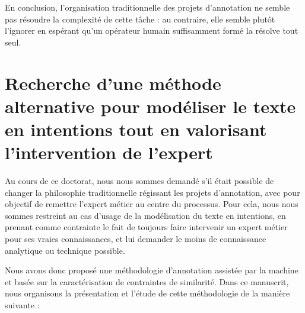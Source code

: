 		En conclusion, l'organisation traditionnelle des projets d'annotation ne semble pas résoudre la complexité de cette tâche : au contraire, elle semble plutôt l'ignorer en espérant qu'un opérateur humain suffisamment formé la résolve tout seul.
		
		
	\section*{Recherche d'une méthode alternative pour modéliser le texte en intentions tout en valorisant l'intervention de l'expert}
		
		Au cours de ce doctorat, nous nous sommes demandé s'il était possible de changer la philosophie traditionnelle régissant les projets d'annotation, avec pour objectif de remettre l'expert métier au centre du processus.
		Pour cela, nous nous sommes restreint au cas d'usage de la modélisation du texte en intentions, en prenant comme contrainte le fait de toujours faire intervenir un expert métier pour ses vraies connaissances, et lui demander le moins de connaissance analytique ou technique possible.
		
		Nous avons donc proposé une méthodologie d'annotation assistée par la machine et basée sur la caractérisation de contraintes de similarité.
		Dans ce manuscrit, nous organisons la présentation et l'étude de cette méthodologie de la manière suivante :
		
